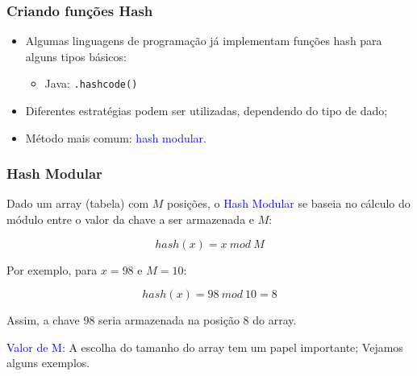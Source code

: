 \documentclass{beamer}
\newcommand{\tcb}[1]{\textcolor{blue}{#1}}
\begin{document}
\begin{frame}
  \frametitle{Criando funções Hash}

  \begin{itemize}
    \item Algumas linguagens de programação já implementam funções hash para alguns tipos básicos:
    \begin{itemize}
      \item Java: \texttt{.hashcode()}
    \end{itemize}
    \item Diferentes estratégias podem ser utilizadas, dependendo do tipo de dado;
    \item Método mais comum: \tcb{hash modular}.
  \end{itemize}
\end{frame}

\begin{frame}
  \frametitle{Hash Modular}

  Dado um array (tabela) com $M$ posições, o \tcb{Hash Modular} se baseia no cálculo do módulo entre o valor da chave a ser armazenada e $M$:

  \[ hash(x) = x~mod~M \]

  Por exemplo, para $x = 98$ e $M = 10$:

  \[ hash(x) = 98~mod~10 = 8\]

  Assim, a chave 98 seria armazenada na posição 8 do array.

  \vspace{1cm}
  \tcb{Valor de M}: A escolha do tamanho do array tem um papel importante; Vejamos alguns exemplos.
\end{frame}
\end{document}
